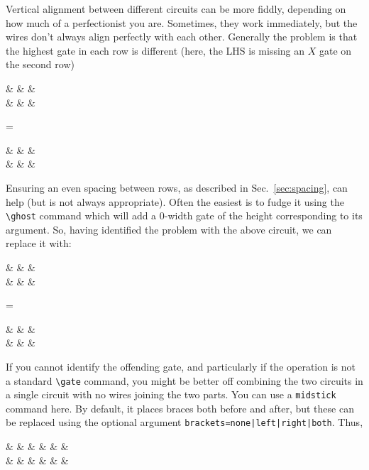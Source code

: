 \documentclass[aps,pra,10pt,nofootinbib]{revtex4-2}
\begin{document}
Vertical alignment between different circuits can be more fiddly, depending on how much of a perfectionist you are. Sometimes, they work immediately, but the wires don't always align perfectly with each other. Generally the problem is that the highest gate in each row is different (here, the LHS is missing an $X$ gate on the second row)
\begin{Code}
  \begin{quantikz}
    &  &  & \\
    & & \targ{} &
  \end{quantikz}
  =\begin{quantikz}
    &  &  & \\
    & \targ{}  &  &
  \end{quantikz}
\end{Code}
\noindent  Ensuring an even spacing between rows, as described in Sec.\ \ref{sec:spacing}, can help (but is not always appropriate). Often the easiest is to fudge it using the \verb!\ghost! command which will add a 0-width gate of the height corresponding to its argument. So, having identified the problem with the above circuit, we can replace it with:
\begin{Code}
  \begin{quantikz}
    &  &  & \\
    &  & \targ{} &
  \end{quantikz}
  =\begin{quantikz}
    &  &  & \\
    & \targ{}  &  &
  \end{quantikz}
\end{Code}

If you cannot identify the offending gate, and particularly if the operation is not a standard \verb!\gate! command, you might be better off combining the two circuits in a single circuit with no wires joining the two parts. You can use a \texttt{midstick} command here. By default, it places braces both before and after, but these can be replaced using the optional argument \texttt{brackets=none|left|right|both}. Thus,
\begin{Code}
  \begin{quantikz}
    & &  & \midstick[2,brackets=none]{=}&  &  & \\
    &  & \targ{} & & \targ{}  &  &
  \end{quantikz}
\end{Code}
\end{document}
